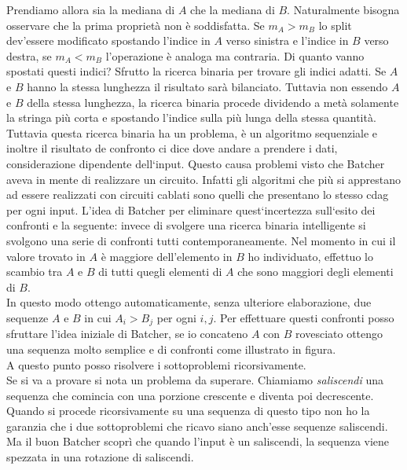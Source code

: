 \documentclass[a4paper,portrait,12pt]{article}
\theoremstyle{definition}
\begin{document}
Prendiamo allora sia la mediana di $A$ che la mediana di $B$.
Naturalmente bisogna osservare che la prima proprietà non è soddisfatta.
Se $m_A > m_B$ lo split dev’essere modificato spostando l’indice in $A$ verso sinistra e l’indice in $B$ verso destra, se $m_A < m_B$ l’operazione è analoga ma contraria. Di quanto vanno spostati questi indici?
Sfrutto la ricerca binaria per trovare gli indici adatti.
Se $A$ e $B$ hanno la stessa lunghezza il risultato sarà bilanciato.
Tuttavia non essendo $A$ e $B$ della stessa lunghezza, la ricerca binaria procede dividendo a metà solamente la stringa più corta e spostando l’indice sulla più lunga della stessa quantità.\\

Tuttavia questa ricerca binaria ha un problema, è un algoritmo sequenziale e inoltre il risultato de confronto ci dice dove andare a prendere i dati, considerazione dipendente dell‘input.
Questo causa problemi visto che Batcher aveva in mente di realizzare un circuito.
Infatti gli algoritmi che più si apprestano ad essere realizzati con circuiti cablati sono quelli che presentano lo stesso cdag per ogni input.
L'idea di Batcher per eliminare quest‘incertezza sull‘esito dei confronti e la seguente: invece di svolgere una ricerca binaria intelligente si svolgono una serie di confronti tutti contemporaneamente.
Nel momento in cui il valore trovato in $A$ è maggiore dell'elemento in $B$ ho individuato, effettuo lo
scambio tra $A$ e $B$ di tutti quegli elementi di $A$ che sono maggiori degli elementi di $B$.\\

In questo modo ottengo automaticamente, senza ulteriore elaborazione, due sequenze $A$ e $B$ in cui $A_i > B_j$ per ogni $i,j$.
Per effettuare questi confronti posso sfruttare l’idea iniziale di Batcher, se io concateno $A$ con $B$ rovesciato ottengo una sequenza molto semplice e di confronti come illustrato in figura.\\

A questo punto posso risolvere i sottoproblemi ricorsivamente.\\

Se si va a provare si nota un problema da superare.
Chiamiamo \textit{saliscendi} una sequenza che comincia con una porzione crescente e diventa poi decrescente.
Quando si procede ricorsivamente su una sequenza di questo tipo non ho la garanzia che i due sottoproblemi che ricavo siano anch’esse sequenze saliscendi.
Ma il buon Batcher scoprì che quando l’input è un saliscendi, la sequenza viene spezzata in una rotazione di saliscendi.
\end{document}
